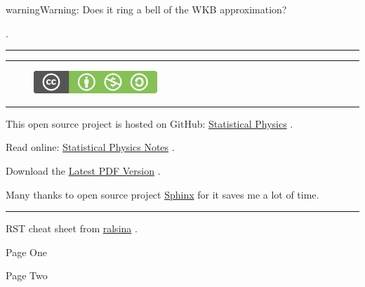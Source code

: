 \documentclass[letterpaper,10pt,english]{sphinxmanual}
\begin{document}
\begin{notice}{warning}{Warning:}
Does it ring a bell of the WKB approximation?
\end{notice}

.


\bigskip\hrule{}\bigskip



\bigskip\hrule{}\bigskip

\begin{figure}[htbp]
\centering
\href{http://creativecommons.org/licenses/by-nc-sa/3.0/us/}{\includegraphics{cc_byncsa.png}}\end{figure}


\bigskip\hrule{}\bigskip


This open source project is hosted on GitHub: \href{https://github.com/emptymalei/StatisticalPhysics}{Statistical Physics} .

Read online: \href{http://emptymalei.github.io/StatisticalPhysics}{Statistical Physics Notes} .

Download the \href{https://github.com/emptymalei/StatisticalPhysics/raw/master/\_build/latex/statistical-physics.pdf}{Latest PDF Version} .

Many thanks to open source project \href{http://sphinx-doc.org}{Sphinx} for it saves me a lot of time.


\bigskip\hrule{}\bigskip


RST cheat sheet from \href{https://github.com/ralsina/rst-cheatsheet}{ralsina} .

Page One

Page Two



\renewcommand{\indexname}{Index}
\printindex
\end{document}
